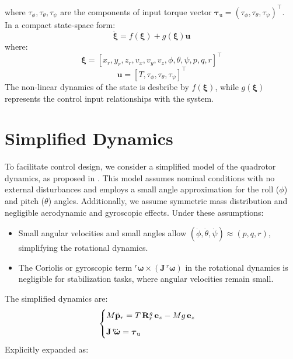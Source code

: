 \noindent
where $\tau_{\phi}, \tau_{\theta}, \tau_{\psi}$  are the components of input
torque vector $\boldsymbol{\tau}_{\text{u}} = (\tau_{\phi}, \tau_{\theta}, \tau_{\psi})^\top $.
\noindent
\\
In a compact state-space form:
\begin{equation}
    \dot{\boldsymbol{\xi}} = f(\boldsymbol{\xi}) + g(\boldsymbol{\xi}) \boldsymbol{u}
\end{equation}
where:
\[
\boldsymbol{\xi} = [x_r, y_r, z_r, v_x, v_y, v_z, \phi, \theta, \psi, p, q, r]^\top
\]
\[
\boldsymbol{u} = [T, \tau_\phi, \tau_\theta, \tau_\psi]^\top
\]
The non-linear dynamics of the state is desbribe by \( f(\boldsymbol{\xi}) \), 
while \( g(\boldsymbol{\xi}) \) represents the control input relationships
with the system.


\section{Simplified Dynamics}
To facilitate control design, we consider a simplified model of the quadrotor dynamics,
as proposed in \cite{simplified_model}. 
This model assumes nominal conditions with no external 
disturbances and employs a small angle approximation 
for the roll (\( \phi \)) and pitch (\( \theta \)) angles. 
Additionally, we assume symmetric mass distribution 
and negligible aerodynamic and gyroscopic effects.
\noindent
Under these assumptions:
\begin{itemize}
    \item Small angular velocities and small angles allow \( (\dot{\phi}, \dot{\theta}, \dot{\psi}) \approx (p, q, r) \),
     simplifying the rotational dynamics.
    \item The Coriolis or gyroscopic term  \( {}^r\boldsymbol{\omega} \times (\mathbf{J} \, {}^r\boldsymbol{\omega}) \) 
    in the rotational dynamics is negligible for stabilization tasks, where angular velocities remain small.
\end{itemize}
The simplified dynamics are:
\begin{equation}
\begin{cases}
    M \ddot{\mathbf{p}}_r = T \, \mathbf{R}_r^g \, \mathbf{e}_z - M g \, \mathbf{e}_z \\[6pt]
    \mathbf{J} \, {}^r\mkern-4mu\dot{\boldsymbol{\omega}} = \boldsymbol{\tau}_{\text{u}}
\end{cases}
\label{eq:simplified_rotational_dynamics}
\end{equation}
Explicitly expanded as:

